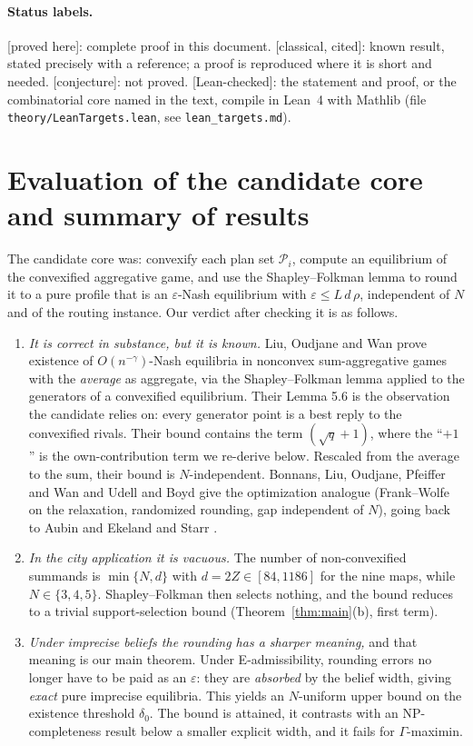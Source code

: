 \documentclass[11pt]{article}
\theoremstyle{definition}
\theoremstyle{remark}
\newcommand{\cP}{\mathcal{P}}
\newcommand{\PROVED}{\textsf{[proved here]}}
\newcommand{\CLASSICAL}{\textsf{[classical, cited]}}
\newcommand{\CONJ}{\textsf{[conjecture]}}
\newcommand{\LEAN}{\textsf{[Lean-checked]}}
\begin{document}
\paragraph{Status labels.} \PROVED: complete proof in this document. \CLASSICAL: known result, stated precisely with a reference; a proof is reproduced where it is short and needed. \CONJ: not proved. \LEAN: the statement and proof, or the combinatorial core named in the text, compile in Lean~4 with Mathlib (file \texttt{theory/LeanTargets.lean}, see \texttt{lean\_targets.md}).

\tableofcontents

\section{Evaluation of the candidate core and summary of results}\label{sec:summary}

The candidate core was: convexify each plan set $\cP_i$, compute an equilibrium of the convexified aggregative game, and use the Shapley--Folkman lemma to round it to a pure profile that is an $\varepsilon$-Nash equilibrium with $\varepsilon\le L\,d\,\rho$, independent of $N$ and of the routing instance. Our verdict after checking it is as follows.
\begin{enumerate}[label=(\roman*)]
\item \emph{It is correct in substance, but it is known.} Liu, Oudjane and Wan \cite{LOW23} prove existence of $O(n^{-\gamma})$-Nash equilibria in nonconvex sum-aggregative games with the \emph{average} as aggregate, via the Shapley--Folkman lemma applied to the generators of a convexified equilibrium. Their Lemma 5.6 is the observation the candidate relies on: every generator point is a best reply to the convexified rivals. Their bound contains the term $(\sqrt q+1)$, where the ``$+1$'' is the own-contribution term we re-derive below. Rescaled from the average to the sum, their bound is $N$-independent. Bonnans, Liu, Oudjane, Pfeiffer and Wan \cite{BLOPW23} and Udell and Boyd \cite{UB16} give the optimization analogue (Frank--Wolfe on the relaxation, randomized rounding, gap independent of $N$), going back to Aubin and Ekeland \cite{AE76} and Starr \cite{Starr69}.
\item \emph{In the city application it is vacuous.} The number of non-convexified summands is $\min\{N,d\}$ with $d=2Z\in[84,1186]$ for the nine maps, while $N\in\{3,4,5\}$. Shapley--Folkman then selects nothing, and the bound reduces to a trivial support-selection bound (Theorem~\ref{thm:main}(b), first term).
\item \emph{Under imprecise beliefs the rounding has a sharper meaning,} and that meaning is our main theorem. Under E-admissibility, rounding errors no longer have to be paid as an $\varepsilon$: they are \emph{absorbed} by the belief width, giving \emph{exact} pure imprecise equilibria. This yields an $N$-uniform upper bound on the existence threshold $\delta_0$. The bound is attained, it contrasts with an NP-completeness result below a smaller explicit width, and it fails for $\Gamma$-maximin.
\end{enumerate}
\end{document}
